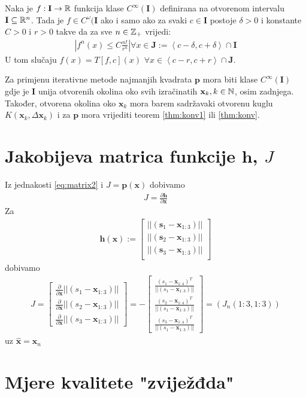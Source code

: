 \documentclass[a4paper,twoside,12pt]{memoir} %
\begin{document}
\begin{thm}\label{thm:konv}
	Naka je $f: \mathbf{I} \to \mathbb{R} $ funkcija klase $C^\infty(\mathbf{I})$ definirana
	na otvorenom intervalu $\mathbf{I} \subseteq \mathbb{R}^n$.
	Tada je $f \in C^\omega(\mathbf{I}$ ako i samo ako za svaki $c \in \mathbf{I}$ postoje
	$\delta > 0$ i konstante $C > 0$ i $ r > 0 $ takve da za sve $n \in \mathbb{Z}_+$ vrijedi:
	\begin{align}
		\left | f^{n}(x)  \leq  C \frac{n!}{r^n}  \right | 
		\forall x \in \mathbf{J} := \left < c-\delta, c+\delta \right > \cap \mathbf{I}
	\end{align}
U tom slučaju $f(x) = T \left[f,c\right](x) $ $
\forall x \in \left < c-r, c+r \right > \cap \mathbf{J}$.
\end{thm}
Za primjenu iterativne metode
najmanjih kvadrata $\mathbf{p}$ mora biti klase $C^\infty(\mathbf{I})$ gdje je $\mathbf{I}$ unija otvorenih okolina oko svih izračinatih $\mathbf{x}_k, k \in \mathbb{N}$, osim zadnjega.
Također, otvorena okolina oko $\mathbf{x}_k$  mora barem sadržavaki otvorenu kuglu $K(\mathbf{x}_k,\Delta \mathbf{x}_k)$ i za $\mathbf{p}$ mora vrijediti teorem \ref{thm:konv1} ili  \ref{thm:konv}.

\chapter{Jakobijeva matrica funkcije $\mathbf{h}$, $J$}
Iz jednakosti \ref{eq:matrix2} i $J = \mathbf{p}(\mathbf{x})$ dobivamo
\begin{align}
J = \frac{\partial \mathbf{h}}{\partial \mathbf{x}}
\end{align}
Za 
\begin{align}
\mathbf{h} (\mathbf{x}) := 
\begin{bmatrix}
||(\mathbf{s}_1-\mathbf{x}_{1:3})|| \\
||(\mathbf{s}_2-\mathbf{x}_{1:3})|| \\
||(\mathbf{s}_3-\mathbf{x}_{1:3})||\\
\end{bmatrix} 
\end{align}
dobivamo
\begin{align}
J = \begin{bmatrix}
\frac{\partial}{\partial \mathbf{x}} ||(s_1-\mathbf{x}_{1:3})|| \\
\frac{\partial}{\partial \mathbf{x}} ||(s_2-\mathbf{x}_{1:3})||\\
\frac{\partial}{\partial \mathbf{x}} ||(s_3-\mathbf{x}_{1:3})|| 
\end{bmatrix}%
= - \begin{bmatrix}
\frac{(s_1-\mathbf{x}_{1:4})^T}{||(s_1-\mathbf{x}_{1:3})||} \\
\frac{(s_2-\mathbf{x}_{1:4})^T}{||(s_1-\mathbf{x}_{1:3})||}\\
\frac{(s_3-\mathbf{x}_{1:4})^T}{||(s_1-\mathbf{x}_{1:3})||} 
\end{bmatrix} = (J_n(1:3,1:3))
\end{align}
uz $\hat{\mathbf{x}} = \mathbf{x}_n$
\chapter{Mjere kvalitete "zviježđda"}\label{appendix:DOP}
\end{document}
